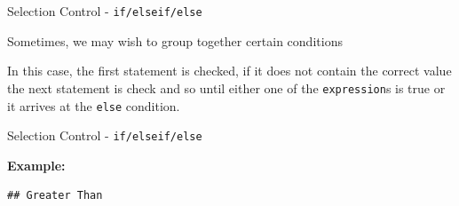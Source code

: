 \begin{frame}[fragile]{Selection Control - \texttt{if/elseif/else}}

Sometimes, we may wish to group together certain conditions

\begin{Shaded}
\begin{Highlighting}[]
\NormalTok{\}}
\end{Highlighting}
\end{Shaded}

In this case, the first statement is checked, if it does not contain the
correct value the next statement is check and so until either one of the
\texttt{expression}s is true or it arrives at the \texttt{else}
condition.

\end{frame}

\begin{frame}[fragile]{Selection Control - \texttt{if/elseif/else}}

\textbf{Example:}

\begin{Shaded}
\begin{Highlighting}[]
\StringTok{ }
\NormalTok{) \{}
  \NormalTok{(}\NormalTok{)}
\StringTok{ }\NormalTok{)\{}
  \NormalTok{(}\NormalTok{)}
  \NormalTok{(}\NormalTok{)}
\NormalTok{\}}
\end{Highlighting}
\end{Shaded}

\begin{verbatim}
## Greater Than
\end{verbatim}

\end{frame}

